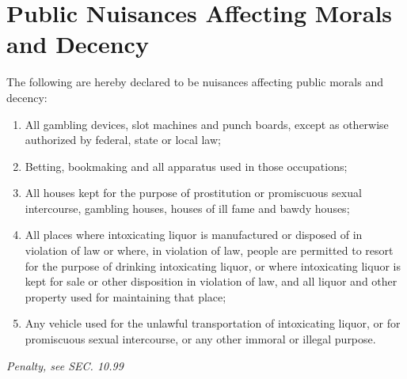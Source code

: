 \documentclass[code.tex]{subfiles}
\begin{document}
\section{Public Nuisances Affecting Morals and Decency}
The following are hereby declared to be nuisances affecting public morals and decency:
\begin{enumerate}[{\indent}A)]
    \item All gambling devices, slot machines and punch boards, except as otherwise authorized by federal, state or local law;
    \item Betting, bookmaking and all apparatus used in those occupations;
    \item All houses kept for the purpose of prostitution or promiscuous sexual intercourse, gambling houses, houses of ill fame and bawdy houses;
    \item All places where intoxicating liquor is manufactured or disposed of in violation of law or where, in violation of law, people are permitted to resort for the purpose of drinking intoxicating liquor, or where intoxicating liquor is kept for sale or other disposition in violation of law, and all liquor and other property used for maintaining that place;
    \item Any vehicle used for the unlawful transportation of intoxicating liquor, or for promiscuous sexual intercourse, or any other immoral or illegal purpose.
\end{enumerate}
\emph{Penalty, see SEC. 10.99}
\end{document}
